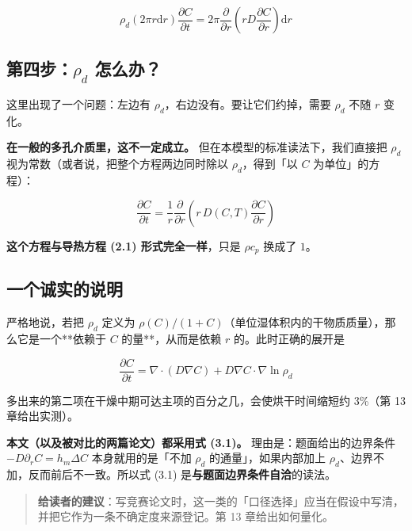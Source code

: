 \begin{equation*}
\rho_d(2\pi r\mathrm{d} r)\frac{\partial C}{\partial t}=2\pi\frac{\partial}{\partial r}\left(rD\frac{\partial C}{\partial r}\right)\mathrm{d} r
\end{equation*}


\subsection{第四步：$\rho_d$ 怎么办？}


这里出现了一个问题：左边有 $\rho_d$，右边没有。要让它们约掉，需要 $\rho_d$ 不随 $r$ 变化。


\textbf{在一般的多孔介质里，这不一定成立。} 但在本模型的标准读法下，我们直接把 $\rho_d$ 视为常数（或者说，把整个方程两边同时除以 $\rho_d$，得到「以 $C$ 为单位」的方程）：


\begin{equation}
\boxed{\ \frac{\partial C}{\partial t}=\frac{1}{r}\frac{\partial}{\partial r}\left(r\,D(C,T)\frac{\partial C}{\partial r}\right)\ }\tag{3.1}
\end{equation}


\textbf{这个方程与导热方程 (2.1) 形式完全一样}，只是 $\rho c_p$ 换成了 $1$。


\subsection{一个诚实的说明}


严格地说，若把 $\rho_d$ 定义为 $\rho(C)/(1+C)$（单位湿体积内的干物质质量），那么它是一个**依赖于 $C$ 的量**，从而是依赖 $r$ 的。此时正确的展开是


\begin{equation}
\frac{\partial C}{\partial t}=\nabla\!\cdot\!(D\nabla C)+D\nabla C\!\cdot\!\nabla\ln\rho_d\tag{3.2}
\end{equation}


多出来的第二项在干燥中期可达主项的百分之几，会使烘干时间缩短约 3\%（第 13 章给出实测）。


\textbf{本文（以及被对比的两篇论文）都采用式 (3.1)。} 理由是：题面给出的边界条件 $-D\partial_rC=h_m\Delta C$ 本身就用的是「不加 $\rho_d$ 的通量」，如果内部加上 $\rho_d$、边界不加，反而前后不一致。所以式 (3.1) 是\textbf{与题面边界条件自洽}的读法。


\begin{quote}
\textbf{给读者的建议}：写竞赛论文时，这一类的「口径选择」应当在假设中写清，并把它作为一条不确定度来源登记。第 13 章给出如何量化。
\end{quote}


